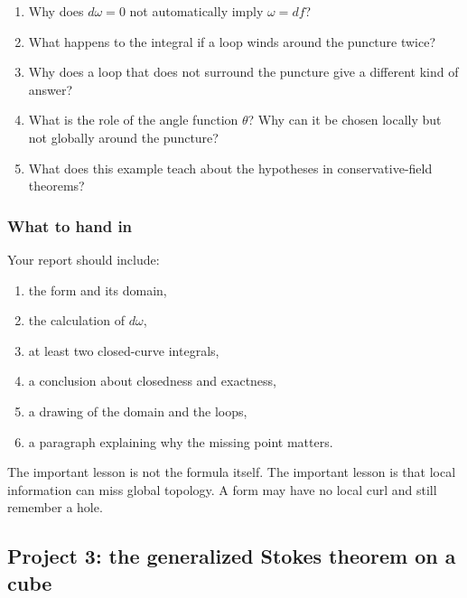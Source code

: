 \begin{enumerate}
\item Why does \(d\omega=0\) not automatically imply \(\omega=df\)?

\item What happens to the integral if a loop winds around the puncture twice?

\item Why does a loop that does not surround the puncture give a different kind of
answer?

\item What is the role of the angle function \(\theta\)?  Why can it be chosen locally but
not globally around the puncture?

\item What does this example teach about the hypotheses in conservative-field
theorems?
\end{enumerate}

\subsubsection*{What to hand in}

Your report should include:

\begin{enumerate}
\item the form and its domain,

\item the calculation of \(d\omega\),

\item at least two closed-curve integrals,

\item a conclusion about closedness and exactness,

\item a drawing of the domain and the loops,

\item a paragraph explaining why the missing point matters.
\end{enumerate}

The important lesson is not the formula itself.  The important lesson is that local
information can miss global topology.  A form may have no local curl and still remember
a hole.

\subsection{Project 3: the generalized Stokes theorem on a cube}

